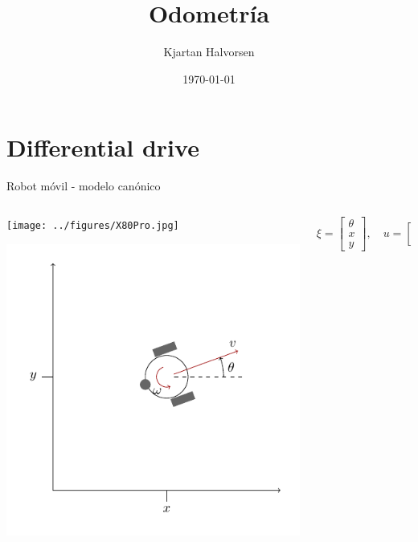 \documentclass[presentation,aspectratio=169]{beamer}
\author{Kjartan Halvorsen}
\date{\today}
\title{Odometría}
\begin{document}
\maketitle

\section{Differential drive}
\label{sec:orga33e36e}

\begin{frame}[label={sec:org22073fb}]{Robot móvil - modelo canónico}
\begin{columns}
\begin{column}{0.4\columnwidth}
\begin{center}
 \texttt{[image: ../figures/X80Pro.jpg]}
\end{center}
\begin{center}
 \includegraphics[width=1.0\linewidth]{../figures/unicycle-model}
\end{center}
\end{column}

\begin{column}{0.6\columnwidth}
\pause


\[ \xi = \begin{bmatrix} \theta\\x\\y \end{bmatrix},   \quad u = \begin{bmatrix} \omega\\v \end{bmatrix}\]




\end{column}
\end{columns}
\end{frame}
\end{document}
